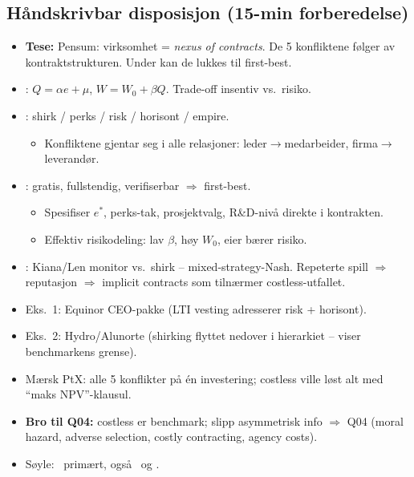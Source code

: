 \subsection*{Håndskrivbar disposisjon (15-min forberedelse)}
\begin{itemize}\setlength{\itemsep}{2pt}
\item \textbf{Tese:} Pensum: virksomhet = \emph{nexus of contracts}. De 5 konfliktene følger av kontraktstrukturen. Under  kan de lukkes til first-best.
\item {}: $Q=\alpha e+\mu$, $W=W_0+\beta Q$. Trade-off insentiv vs.\ risiko.
\item {}: shirk / perks / risk / horisont / empire.
  \begin{itemize}
    \item Konfliktene gjentar seg i alle relasjoner: leder$\to$medarbeider, firma$\to$leverandør.
  \end{itemize}
\item {}: gratis, fullstendig, verifiserbar $\Rightarrow$ first-best.
  \begin{itemize}
    \item Spesifiser $e^\ast$, perks-tak, prosjektvalg, R\&D-nivå direkte i kontrakten.
    \item Effektiv risikodeling: lav $\beta$, høy $W_0$, eier bærer risiko.
  \end{itemize}
\item {}: Kiana/Len monitor vs.\ shirk -- mixed-strategy-Nash. Repeterte spill $\Rightarrow$ reputasjon $\Rightarrow$ implicit contracts som tilnærmer costless-utfallet.
\item Eks.\ 1: Equinor CEO-pakke (LTI vesting adresserer risk + horisont).
\item Eks.\ 2: Hydro/Alunorte (shirking flyttet nedover i hierarkiet -- viser benchmarkens grense).
\item Mærsk PtX: alle 5 konflikter på én investering; costless ville løst alt med ``maks NPV''-klausul.
\item \textbf{Bro til Q04:} costless er benchmark; slipp asymmetrisk info $\Rightarrow$ Q04 (moral hazard, adverse selection, costly contracting, agency costs).
\item Søyle: \SThree\ primært, også \SOne\ og \STwo.
\end{itemize}
